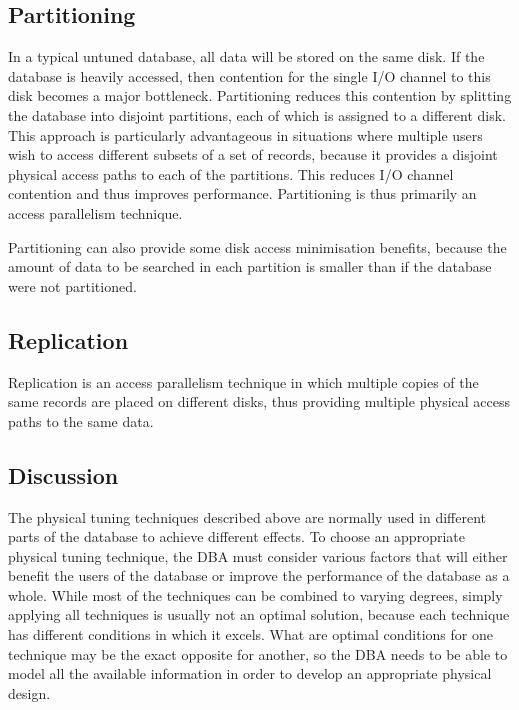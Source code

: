 \documentclass{llncs}
\begin{document}
\subsection{Partitioning}

In a typical untuned database, all data will be stored on the same disk. If the database is heavily accessed, then contention for the single I/O channel to this disk becomes a major bottleneck. Partitioning reduces this contention by splitting the database into disjoint partitions, each of which is assigned to a different disk. This approach is particularly advantageous in situations where multiple users wish to access different subsets of a set of records, because it provides a disjoint physical access paths to each of the partitions. This reduces I/O channel contention and thus improves performance. Partitioning is thus primarily an access parallelism technique.

Partitioning can also provide some disk access minimisation benefits, because the amount of data to be searched in each partition is smaller than if the database were not partitioned.


\subsection{Replication}

Replication is an access parallelism technique in which multiple copies of the same records are placed on different disks, thus providing multiple physical access paths to the same data.


\subsection{Discussion}

The physical tuning techniques described above are normally used in different parts of the database to achieve different effects. To choose an appropriate physical tuning technique, the DBA must consider various factors that will either benefit the users of the database or improve the performance of the database as a whole. While most of the techniques can be combined to varying degrees, simply applying all techniques is usually not an optimal solution, because each technique has different conditions in which it excels. What are optimal conditions for one technique may be the exact opposite for another, so the DBA needs to be able to model all the available information in order to develop an appropriate physical design.
\end{document}
